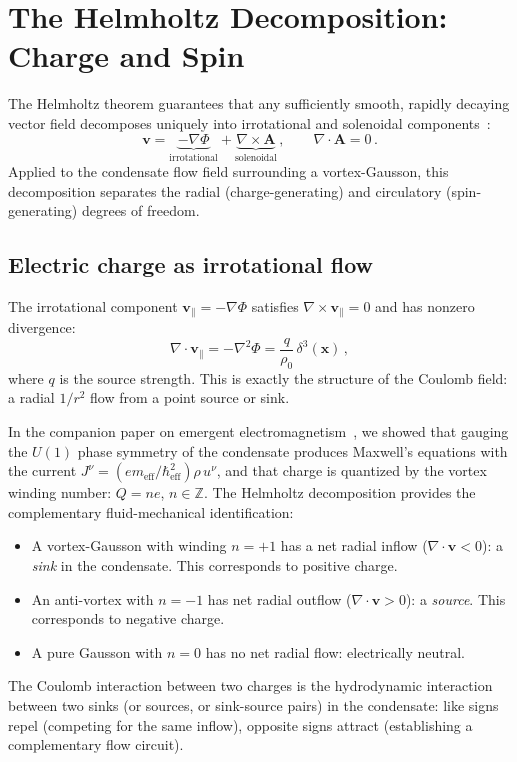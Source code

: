 \documentclass[12pt, a4paper]{article}
\newcommand{\meff}{m_{\mathrm{eff}}}
\newcommand{\heff}{\hbar_{\mathrm{eff}}}
\begin{document}
\section{The Helmholtz Decomposition: Charge and Spin}
\label{sec:helmholtz}

The Helmholtz theorem guarantees that any
sufficiently smooth, rapidly decaying vector field
decomposes uniquely into irrotational and solenoidal
components~\cite{griffiths_1999}:
\begin{equation}
    \mathbf{v} = \underbrace{-\nabla\Phi}_{
    \text{irrotational}}
    + \underbrace{\nabla\times\mathbf{A}}_{
    \text{solenoidal}}\,,
    \qquad \nabla\cdot\mathbf{A} = 0\,.
\label{eq:helmholtz}
\end{equation}
Applied to the condensate flow field surrounding a
vortex-Gausson, this decomposition separates the
radial (charge-generating) and circulatory
(spin-generating) degrees of freedom.

\subsection{Electric charge as irrotational flow}

The irrotational component
$\mathbf{v}_\parallel = -\nabla\Phi$ satisfies
$\nabla\times\mathbf{v}_\parallel = 0$ and has
nonzero divergence:
\begin{equation}
    \nabla\cdot\mathbf{v}_\parallel = -\nabla^2\Phi
    = \frac{q}{\rho_0}\,\delta^3(\mathbf{x})\,,
\label{eq:div_charge}
\end{equation}
where $q$ is the source strength. This is exactly
the structure of the Coulomb field: a radial $1/r^2$
flow from a point source or sink.

In the companion paper on emergent
electromagnetism~\cite{kulangiev_maxwell}, we showed
that gauging the $U(1)$ phase symmetry of the
condensate produces Maxwell's equations with the
current $J^\nu = (e\meff/\heff^2)\rho\,u^\nu$, and
that charge is quantized by the vortex winding
number: $Q = ne$, $n \in \mathbb{Z}$. The Helmholtz
decomposition provides the complementary fluid-mechanical
identification:
\begin{itemize}
\item A vortex-Gausson with winding $n = +1$ has a
  net radial inflow ($\nabla\cdot\mathbf{v} < 0$):
  a \emph{sink} in the condensate. This corresponds
  to positive charge.
\item An anti-vortex with $n = -1$ has net radial
  outflow ($\nabla\cdot\mathbf{v} > 0$): a
  \emph{source}. This corresponds to negative charge.
\item A pure Gausson with $n = 0$ has no net radial
  flow: electrically neutral.
\end{itemize}
The Coulomb interaction between two charges is the
hydrodynamic interaction between two sinks (or
sources, or sink-source pairs) in the condensate:
like signs repel (competing for the same inflow),
opposite signs attract (establishing a complementary
flow circuit).
\end{document}
